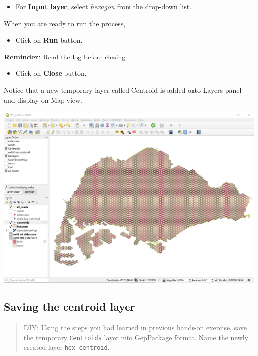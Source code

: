 \documentclass[
  letterpaper,
  DIV=11,
  numbers=noendperiod]{scrreprt}
\providecommand{\tightlist}{%
  \setlength{\itemsep}{0pt}\setlength{\parskip}{0pt}}\usepackage{longtable,booktabs,array}
\begin{document}
\begin{itemize}
\tightlist
\item
  For \textbf{Input layer}, select \emph{hexagon} from the drop-down
  list.
\end{itemize}

When you are ready to run the process,

\begin{itemize}
\tightlist
\item
  Click on \textbf{Run} button.
\end{itemize}

\textbf{Reminder:} Read the log before closing.

\begin{itemize}
\tightlist
\item
  Click on \textbf{Close} button.
\end{itemize}

Notice that a new temporary layer called Centroid is added onto Layers
panel and display on Map view.

\includegraphics{./img09/image5.jpg}

\hypertarget{saving-the-centroid-layer}{%
\subsection{Saving the centroid layer}\label{saving-the-centroid-layer}}

\begin{quote}
DIY: Using the steps you had learned in previous hands-on exercise, save
the temporary \texttt{Centroids} layer into GepPackage format. Name the
newly created layer \texttt{hex\_centroid}.
\end{quote}
\end{document}
